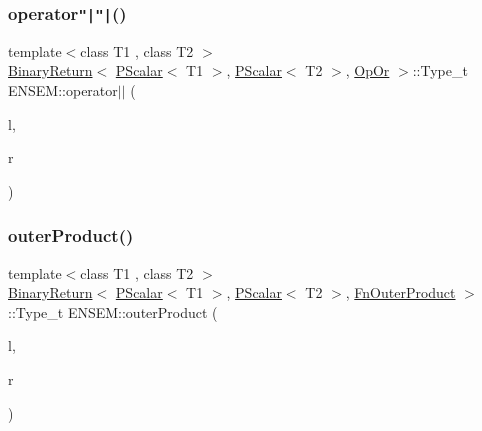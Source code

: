 \mbox{\label{group__primscalar_ga7955d37fbeaea4b15d725326bfcbc0b1}} 
\subsubsection{\texorpdfstring{operator\texttt{"|}\texttt{"|}()}{operator||()}}
{\footnotesize\ttfamily template$<$class T1 , class T2 $>$ \\
\mbox{\hyperlink{structENSEM_1_1BinaryReturn}{Binary\+Return}}$<$ \mbox{\hyperlink{classENSEM_1_1PScalar}{P\+Scalar}}$<$ T1 $>$, \mbox{\hyperlink{classENSEM_1_1PScalar}{P\+Scalar}}$<$ T2 $>$, \mbox{\hyperlink{structENSEM_1_1OpOr}{Op\+Or}} $>$\+::Type\+\_\+t E\+N\+S\+E\+M\+::operator$\vert$$\vert$ (\begin{DoxyParamCaption}\item[{const \mbox{\hyperlink{classENSEM_1_1PScalar}{P\+Scalar}}$<$ T1 $>$ \&}]{l,  }\item[{const \mbox{\hyperlink{classENSEM_1_1PScalar}{P\+Scalar}}$<$ T2 $>$ \&}]{r }\end{DoxyParamCaption})\hspace{0.3cm}{\ttfamily [inline]}}

\mbox{\label{group__primscalar_gaa87ddc7f8a5ec9fc1cb807c54d727128}} 
\subsubsection{\texorpdfstring{outerProduct()}{outerProduct()}}
{\footnotesize\ttfamily template$<$class T1 , class T2 $>$ \\
\mbox{\hyperlink{structENSEM_1_1BinaryReturn}{Binary\+Return}}$<$ \mbox{\hyperlink{classENSEM_1_1PScalar}{P\+Scalar}}$<$ T1 $>$, \mbox{\hyperlink{classENSEM_1_1PScalar}{P\+Scalar}}$<$ T2 $>$, \mbox{\hyperlink{structENSEM_1_1FnOuterProduct}{Fn\+Outer\+Product}} $>$\+::Type\+\_\+t E\+N\+S\+E\+M\+::outer\+Product (\begin{DoxyParamCaption}\item[{const \mbox{\hyperlink{classENSEM_1_1PScalar}{P\+Scalar}}$<$ T1 $>$ \&}]{l,  }\item[{const \mbox{\hyperlink{classENSEM_1_1PScalar}{P\+Scalar}}$<$ T2 $>$ \&}]{r }\end{DoxyParamCaption})\hspace{0.3cm}{\ttfamily [inline]}}



